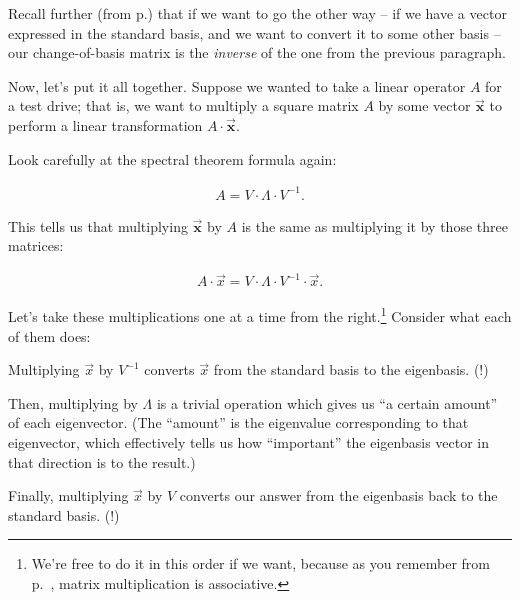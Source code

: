 Recall further (from p.\pageref{changeOfBasisOtherWayFinally}) that if we want
to go the other way -- if we have a vector expressed in the standard basis, and
we want to convert it to some other basis -- our change-of-basis matrix is the
\textit{inverse} of the one from the previous paragraph.

Now, let's put it all together. Suppose we wanted to take a linear operator $A$
for a test drive; that is, we want to multiply a square matrix $A$ by some
vector $\overrightarrow{\textbf{x}}$ to perform a linear transformation $A
\cdot \overrightarrow{\textbf{x}}$.

Look carefully at the spectral theorem formula again:

\vspace{-.15in}
\begin{align*}
A = V \cdot \Lambda \cdot V^{-1}.
\end{align*}
\vspace{-.15in}

This tells us that multiplying $\overrightarrow{\textbf{x}}$ by $A$ is the same
as multiplying it by those three matrices:

\vspace{-.15in}
\begin{align*}
A \cdot \overrightarrow{x} = V \cdot \Lambda \cdot V^{-1} \cdot
\overrightarrow{x}.
\end{align*}
\vspace{-.15in}


Let's take these multiplications one at a time from the right.\footnote{We're
free to do it in this order if we want, because as you remember from
p.~\pageref{associative}, matrix multiplication is associative.} Consider what
each of them does:

\begin{compactenum}

\item Multiplying $\overrightarrow{x}$ by $V^{-1}$ converts
$\overrightarrow{x}$ from the standard basis to the eigenbasis. (!)

\item Then, multiplying by $\Lambda$ is a trivial operation which gives us ``a
certain amount'' of each eigenvector. (The ``amount'' is the eigenvalue
corresponding to that eigenvector, which effectively tells us how ``important''
the eigenbasis vector in that direction is to the result.)

\item Finally, multiplying $\overrightarrow{x}$ by $V$ converts
our answer from the eigenbasis back to the standard basis. (!)

\end{compactenum}

